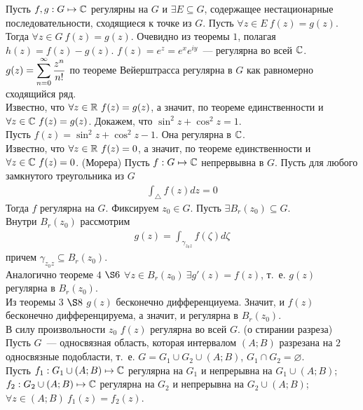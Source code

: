 \corollary
Пусть $f, g: G \mapsto \mathbb{C}$ регулярны на $G$ и $\exists E \subseteq G$,
содержащее нестационарные последовательности, сходящиеся к точке из $G$. Пусть
$\forall z \in E \ f(z) = g(z)$.
\\
Тогда $\forall z \in G \ f(z) = g(z)$.
\pr
Очевидно из теоремы $1$, полагая $h(z) = f(z) - g(z)$.
\example
$f(z) = e^z = e^{x}e^{iy}$~--- регулярна во всей $\mathbb{C}$.
\\
$g(z) = \displaystyle \sum_{n=0}^{\infty} \displaystyle \frac{z^n}{n!}$ по теореме Вейерштрасса
регулярна в $G$ как равномерно сходящийся ряд.
\\
Известно, что $\forall z \in \mathbb{R} \ f(z) = g(z)$, а значит, по теореме
единственности и $\forall z \in \mathbb{C} \ f(z) = g(z)$.
\example
Докажем, что $\sin^2 z + \cos^2 z = 1$.
\\
Пусть $f(z) = \sin^2 z + \cos^2 z - 1$. Она регулярна в $\mathbb{C}$.
\\
Известно, что $\forall z \in \mathbb{R} \ f(z) = 0$, а значит, по теореме
единственности и $\forall z \in \mathbb{C} \ f(z) = 0$.
\theorem (Морера)
Пусть $f: G \mapsto \mathbb{C}$ непрервывна в $G$. Пусть для любого замкнутого
треугольника из $G$
\begin{align*}
  \int_{\triangle}f(z) dz = 0
\end{align*}
Тогда $f$ регулярна на $G$.
\pr
Фиксируем $z_0 \in G$. Пусть $\exists B_r(z_0)\subseteq G$.
\\
Внутри $B_r(z_0)$ рассмотрим
\begin{align*}
  g(z) = \int_{\gamma_{z_0 z}}f(\zeta) d \zeta
\end{align*}
причем $\gamma_{z_0z}\subseteq B_{r}(z_0)$.
\\
Аналогично теореме $4$ $\S 6$ $\forall z \in B_r(z_0) \ \exists g'(z) = f(z)$,
т.~е. $g(z)$ регулярна в $B_r(z_0)$.
\\
Из теоремы $3$ $\S8$ $g(z)$ бесконечно дифференциуема. Значит, и $f(z)$
бесконечно дифференцируема, а значит, и регулярна в $B_r(z_0)$.
\\
В силу произвольности $z_0$ $f(z)$ регулярна во всей $G$.
\theorem (о стирании разреза)
Пусть $G$~--- односвязная область, которая интервалом $(A;B)$ разрезана на $2$
односвязные подобласти, т.~е. $G = G_1 \cup G_2 \cup (A;B)$, $G_1 \cap G_2 =
\varnothing$.
\\
Пусть $f_1: G_1 \cup (A;B) \mapsto \mathbb{C}$ регулярна на $G_1$ и непрерывна на $G_1
\cup (A;B)$; $f_2: G_2 \cup (A;B) \mapsto \mathbb{C}$ регулярна на $G_2$ и непрерывна
на $G_2 \cup (A;B)$; $\forall z \in (A;B) \ f_1(z) = f_2(z)$.
\\

